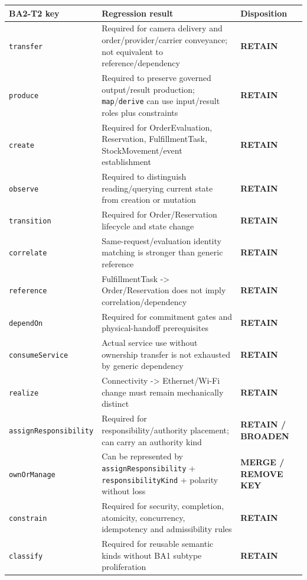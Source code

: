 \documentclass[
  10pt,
  a4paper,
]{article}
\begin{document}
\begin{longtable}[]{@{}lll@{}}
\toprule\noalign{}
BA2-T2 key & Regression result & Disposition \\
\midrule\noalign{}
\endhead
\bottomrule\noalign{}
\endlastfoot
\texttt{transfer} & Required for camera delivery and
order/provider/carrier conveyance; not equivalent to
reference/dependency & \textbf{RETAIN} \\
\texttt{produce} & Required to preserve governed output/result
production; \texttt{map}/\texttt{derive} can use input/result roles plus
constraints & \textbf{RETAIN} \\
\texttt{create} & Required for OrderEvaluation, Reservation,
FulfillmentTask, StockMovement/event establishment & \textbf{RETAIN} \\
\texttt{observe} & Required to distinguish reading/querying current
state from creation or mutation & \textbf{RETAIN} \\
\texttt{transition} & Required for Order/Reservation lifecycle and state
change & \textbf{RETAIN} \\
\texttt{correlate} & Same-request/evaluation identity matching is
stronger than generic reference & \textbf{RETAIN} \\
\texttt{reference} & FulfillmentTask -\textgreater{} Order/Reservation
does not imply correlation/dependency & \textbf{RETAIN} \\
\texttt{dependOn} & Required for commitment gates and physical-handoff
prerequisites & \textbf{RETAIN} \\
\texttt{consumeService} & Actual service use without ownership transfer
is not exhausted by generic dependency & \textbf{RETAIN} \\
\texttt{realize} & Connectivity -\textgreater{} Ethernet/Wi-Fi change
must remain mechanically distinct & \textbf{RETAIN} \\
\texttt{assignResponsibility} & Required for responsibility/authority
placement; can carry an authority kind & \textbf{RETAIN / BROADEN} \\
\texttt{ownOrManage} & Can be represented by
\texttt{assignResponsibility} + \texttt{responsibilityKind} + polarity
without loss & \textbf{MERGE / REMOVE KEY} \\
\texttt{constrain} & Required for security, completion, atomicity,
concurrency, idempotency and admissibility rules & \textbf{RETAIN} \\
\texttt{classify} & Required for reusable semantic kinds without BA1
subtype proliferation & \textbf{RETAIN} \\
\end{longtable}
\end{document}
